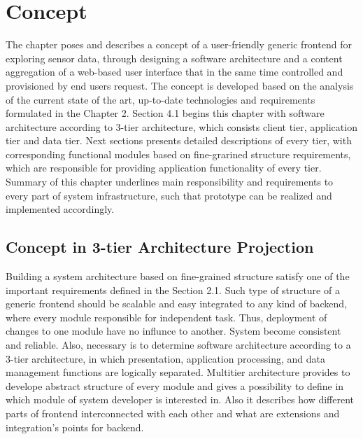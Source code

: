 \chapter{Concept}
     The chapter poses and describes a concept of a user-friendly generic frontend for exploring sensor data, 
     through designing a software architecture and a content aggregation of a web-based user interface that in the same time controlled and provisioned by end users request. The concept is developed based on the analysis of the current state of the art, up-to-date technologies and requirements formulated in the Chapter 2. 
     \newline
     Section 4.1 begins this chapter with software architecture according to 3-tier architecture, which consists client tier, application tier and data tier. Next sections presents detailed descriptions of every tier, with corresponding functional modules based on fine-grarined structure requirements, which are responsible for providing application functionality of every tier. Summary of this chapter underlines main responsibility and requirements to every part of system infrastructure, such that prototype can be realized and implemented accordingly.


\section{Concept in 3-tier Architecture Projection}

  Building a system architecture based on fine-grained structure satisfy one of the important requirements defined in the Section 2.1. Such type of structure of a generic frontend should be scalable and easy integrated to any kind of backend, where every module responsible for independent task. Thus, deployment of changes to one module have no influnce to another. System become consistent and reliable. Also, necessary is to determine software architecture according to a 3-tier architecture, in which presentation, application processing, and data management functions are logically separated. Multitier architecture provides to develope abstract structure of every module and gives a possibility to define in which module of system developer is interested in. Also it describes how different parts of frontend interconnected with each other and what are extensions and integration's points for backend.

